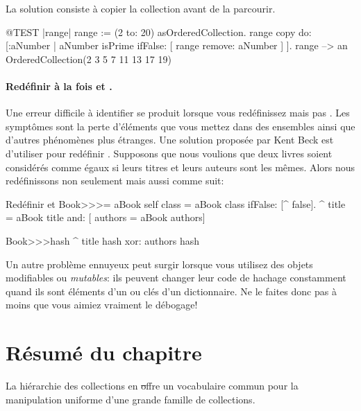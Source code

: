 \documentclass[a4paper,10pt,twoside]{book}
\begin{document}
La solution consiste à copier la collection avant de la parcourir.
\begin{code}{@TEST |range|}
range := (2 to: 20) asOrderedCollection.
range copy do: [:aNumber | aNumber isPrime ifFalse: [ range remove: aNumber ] ].
range --> an OrderedCollection(2 3 5 7 11 13 17 19)
\end{code}

\paragraph{Redéfinir à la fois \ct{=} et .}
Une erreur difficile à identifier se produit lorsque vous
redéfinissez \ct{=} mais pas . Les symptômes sont
la perte d'éléments que vous mettez dans des ensembles ainsi
que d'autres phénomènes plus étranges. Une solution proposée
par Kent Beck est d'utiliser  pour redéfinir .
Supposons que nous voulions que deux livres soient considérés comme
égaux si leurs titres et leurs auteurs sont les mêmes.
Alors nous redéfinissons non seulement
\ct{=} mais aussi  comme suit:

\begin{method}{Redéfinir \ct{=} et }
Book>>>= aBook
   self class = aBook class ifFalse: [^ false].
   ^ title = aBook title and: [ authors = aBook authors]

Book>>>hash 
   ^ title hash xor: authors hash
\end{method}

Un autre problème ennuyeux peut surgir lorsque vous utilisez des
objets modifiables ou \emph{mutables}: ils peuvent changer leur
code de hachage constamment quand ils sont éléments d'un 
ou clés d'un dictionnaire. 
Ne le faites donc pas à moins que vous aimiez vraiment le débogage!

\section{Résumé du chapitre}

La hiérarchie des collections en \st offre un vocabulaire commun pour la manipulation 
uniforme d'une grande famille de collections.
\end{document}
